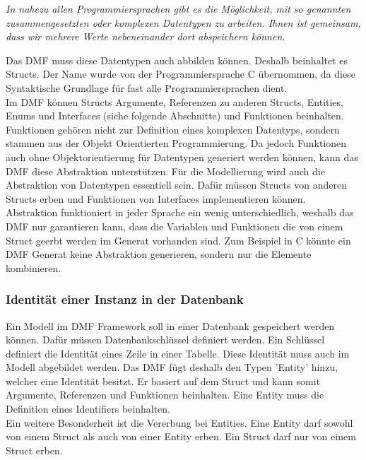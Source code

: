 \documentclass[./einleitung.tex]{subfiles}
\begin{document}
 \begin{center}
 \textit{
In nahezu allen Programmiersprachen gibt es die Möglichkeit, mit so genannten zusammengesetzten oder komplexen Datentypen zu arbeiten. Ihnen ist gemeinsam, dass wir mehrere Werte nebeneinander dort abspeichern können.\cite{978-3-8348-9999-6.pdf}}
\end{center}
Das DMF muss diese Datentypen auch abbilden können. Deshalb beinhaltet es Structs. Der Name wurde von der Programmiersprache C übernommen, da diese Syntaktische Grundlage für fast alle Programmiersprachen dient. \\
Im DMF können Structs Argumente, Referenzen zu anderen Structs, Entities, Enums und Interfaces (siehe folgende Abschnitte) und Funktionen beinhalten.
Funktionen gehören nicht zur Definition eines komplexen Datentyps, sondern stammen aus der Objekt Orientierten Programmierung. Da jedoch Funktionen auch ohne Objektorientierung für Datentypen generiert werden können, kann das DMF diese Abstraktion unterstützen.
\newline
Für die Modellierung wird auch die Abstraktion von Datentypen essentiell sein. Dafür müssen Structs von anderen Structs erben und Funktionen von Interfaces implementieren können. \\
Abstraktion funktioniert in jeder Sprache ein wenig unterschiedlich, weshalb das DMF nur garantieren kann, dass die Variablen und Funktionen die von einem Struct geerbt werden im Generat vorhanden sind. Zum Beispiel in C könnte ein DMF Generat keine Abstraktion generieren, sondern nur die Elemente kombinieren.

\subsubsection{Identität einer Instanz in der Datenbank}
Ein Modell im DMF Framework soll in einer Datenbank gespeichert werden können.
Dafür müssen Datenbankschlüssel definiert werden. Ein Schlüssel definiert die Identität eines Zeile in einer Tabelle.
Diese Identität muss auch im Modell abgebildet werden.
Das DMF fügt deshalb den Typen 'Entity' hinzu, welcher eine Identität besitzt. Er basiert auf dem Struct und kann somit Argumente, Referenzen und Funktionen beinhalten.
Eine Entity muss die Definition eines Identifiers beinhalten. \\

Ein weitere Besonderheit ist die Vererbung bei Entities. Eine Entity darf sowohl von einem Struct als auch von einer Entity erben. Ein Struct darf nur von einem Struct erben.
\end{document}
